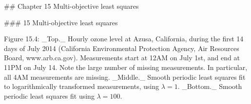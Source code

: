 

## Chapter 15 Multi-objective least squares

### 15 Multi-objective least squares

Figure 15.4: _Top._ Hourly ozone level at Azusa, California, during the first 14 days of July 2014 (California Environmental Protection Agency, Air Resources Board, www.arb.ca.gov). Measurements start at 12AM on July 1st, and end at 11PM on July 14. Note the large number of missing measurements. In particular, all 4AM measurements are missing. _Middle._ Smooth periodic least squares fit to logarithmically transformed measurements, using \(\lambda=1\). _Bottom._ Smooth periodic least squares fit using \(\lambda=100\).

